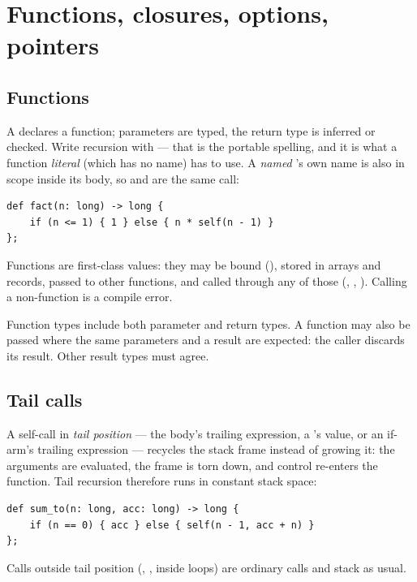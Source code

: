 \section{Functions, closures, options, pointers}
\label{sec:functions}

\subsection{Functions}

A  declares a function; parameters are typed, the return type is
inferred or checked. Write recursion with  --- that is the
portable spelling, and it is what a function \emph{literal} (which has no
name) has to use. A \emph{named} 's own name is also in scope
inside its body, so  and 
are the same call:

\begin{lstlisting}
def fact(n: long) -> long {
    if (n <= 1) { 1 } else { n * self(n - 1) }
};
\end{lstlisting}

\noindent Functions are first-class values: they may be bound
(), stored in arrays and records, passed to other
functions, and called through any of those (, ,
). Calling a non-function is a compile error.

Function types include both parameter and return types. A function may also
be passed where the same parameters and a  result are expected: the
caller discards its result. Other result types must agree.

\subsection{Tail calls}

A self-call in \emph{tail position} --- the body's trailing expression,
a 's value, or an if-arm's trailing expression --- recycles
the stack frame instead of growing it: the arguments are evaluated, the
frame is torn down, and control re-enters the function. Tail recursion
therefore runs in constant stack space:

\begin{lstlisting}
def sum_to(n: long, acc: long) -> long {
    if (n == 0) { acc } else { self(n - 1, acc + n) }
};
\end{lstlisting}

\noindent Calls outside tail position (,
, inside loops) are ordinary calls and stack as
usual.

